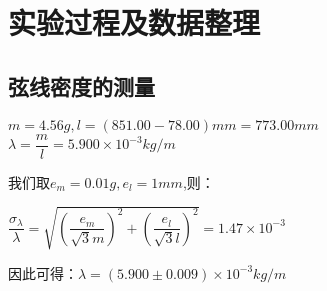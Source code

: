 \documentclass[UTF8]{ctexart}
\begin{document}
	\section{实验过程及数据整理}
	\subsection{弦线密度的测量}
	\begin{center}
		$m=4.56g,l=(851.00-78.00)mm=773.00mm$\\
		$\lambda=\dfrac{m}{l}=5.900\times 10^{-3}kg/m$
	\end{center}
\par 我们取$e_{m}=0.01g,e_{l}=1mm$,则：
\begin{center}
	$\dfrac{\sigma_{\lambda}}{\lambda}=\sqrt{(\dfrac{e_{m}}{\sqrt{3}m})^{2}+(\dfrac{e_{l}}{\sqrt{3}l})^{2}}=1.47\times 10^{-3}$
\end{center}
\par 因此可得：$\lambda=(5.900\pm 0.009)\times10^{-3}kg/m$
\end{document}
